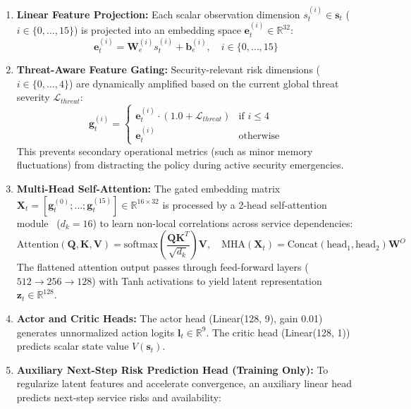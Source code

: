 \documentclass[ASNA,twocolumn]{USG}
\begin{document}
\begin{enumerate}
    \item \textbf{Linear Feature Projection:} Each scalar observation dimension $s_t^{(i)} \in \mathbf{s}_t$ ($i \in \{0, \ldots, 15\}$) is projected into an embedding space $\mathbf{e}_t^{(i)} \in \mathbb{R}^{32}$:
    \begin{equation}
        \mathbf{e}_t^{(i)} = \mathbf{W}_e^{(i)} s_t^{(i)} + \mathbf{b}_e^{(i)}, \quad i \in \{0, \ldots, 15\}
    \end{equation}
    \item \textbf{Threat-Aware Feature Gating:} Security-relevant risk dimensions ($i \in \{0, \ldots, 4\}$) are dynamically amplified based on the current global threat severity $\mathcal{L}_{threat}$:
    \begin{equation}
        \mathbf{g}_t^{(i)} = \begin{cases}
            \mathbf{e}_t^{(i)} \cdot \left(1.0 + \mathcal{L}_{threat}\right) & \text{if } i \le 4 \\
            \mathbf{e}_t^{(i)} & \text{otherwise}
        \end{cases}
    \end{equation}
    This prevents secondary operational metrics (such as minor memory fluctuations) from distracting the policy during active security emergencies.
    \item \textbf{Multi-Head Self-Attention:} The gated embedding matrix $\mathbf{X}_t = [\mathbf{g}_t^{(0)}; \ldots; \mathbf{g}_t^{(15)}] \in \mathbb{R}^{16 \times 32}$ is processed by a 2-head self-attention module~\cite{vaswani2017attention} ($d_k = 16$) to learn non-local correlations across service dependencies:
    \begin{equation}
        \text{Attention}(\mathbf{Q}, \mathbf{K}, \mathbf{V}) = \text{softmax}\left(\frac{\mathbf{Q}\mathbf{K}^T}{\sqrt{d_k}}\right)\mathbf{V}, \quad \text{MHA}(\mathbf{X}_t) = \text{Concat}(\text{head}_1, \text{head}_2) \mathbf{W}^O
    \end{equation}
    The flattened attention output passes through feed-forward layers ($512 \rightarrow 256 \rightarrow 128$) with Tanh activations to yield latent representation $\mathbf{z}_t \in \mathbb{R}^{128}$.
    \item \textbf{Actor and Critic Heads:} The actor head (Linear(128, 9), gain 0.01) generates unnormalized action logits $\mathbf{l}_t \in \mathbb{R}^9$. The critic head (Linear(128, 1)) predicts scalar state value $V(\mathbf{s}_t)$.
    \item \textbf{Auxiliary Next-Step Risk Prediction Head (Training Only):} To regularize latent features and accelerate convergence, an auxiliary linear head predicts next-step service risks and availability:

\end{enumerate}
\end{document}
